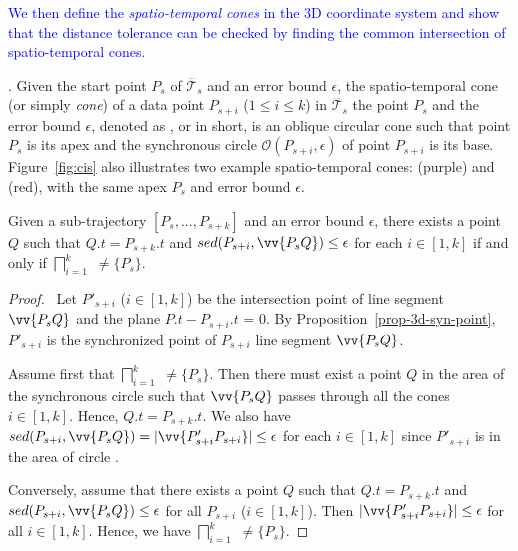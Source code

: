 \textcolor{blue}{We then define the \textit{spatio-temporal cones} in the 3D coordinate system and show that the \sed distance tolerance can be checked by finding the common intersection of spatio-temporal cones.}

. Given the start point $P_s$ of $\dddot{\mathcal{T}_s}$ and an error bound $\epsilon$, the spatio-temporal cone (or simply \textit{cone}) of a data point $P_{s+i}$ ($1\le i\le k$) in $\dddot{\mathcal{T}_s}$ \wrt the point $P_s$ and the error bound $\epsilon$, denoted as , or  in short, is an oblique circular cone such that point $P_s$ is its apex and the synchronous circle $\mathcal{O}(P_{s+i}, \epsilon)$ of point $P_{s+i}$ is its base.
%
Figure~\ref{fig:cis} also illustrates two example spatio-temporal cones:  {(purple)} and  (red), with the same apex $P_s$ and error bound $\epsilon$.






\begin{prop}
\label{prop-3d-ci}
Given a sub-trajectory $[P_s,...,P_{s+k}]$ and an error bound $\epsilon$, there exists a point $Q$ such that $Q.t = P_{s+k}.t$ and $sed(P_{s+i}, \vv{P_sQ})\le \epsilon$ for each $i \in [1,k]$ if and only if $\bigsqcap_{i=1}^{k}$ $\ne \{P_s\}$.
\end{prop}

\begin{proof}\
Let $P'_{s+i}$ ($i\in[1, k]$) be the intersection point of line segment $\vv{P_sQ}$ and the plane $P.t - P_{s+i}.t$ = $0$.
By Proposition~\ref{prop-3d-syn-point}, $P'_{s+i}$ is the synchronized point of $P_{s+i}$ \wrt line segment $\vv{P_sQ}$.

Assume first that $\bigsqcap_{i=1}^{k}$ $\ne \{P_s\}$. Then there must exist a point $Q $ in the area of the  synchronous circle  such that $\vv{P_sQ}$ passes through all the cones  $i\in[1, k]$. Hence,  $Q.t = P_{s+k}.t$.
We also have $sed(P_{s+i}, \vv{P_sQ}) = |\vv{P'_{s+i}P_{s+i}}| \le \epsilon$ for each $i \in [1, k]$  since $P'_{s+i}$  is in the area of circle  \circle{(P_{s+i}, \epsilon)}.

Conversely, assume that there exists a point $Q$ such that $Q.t = P_{s+k}.t$ and $sed(P_{s+i}, \vv{P_sQ})\le\epsilon$ for all $P_{s+i}$ ($i \in [1,k]$). Then $|\vv{P'_{s+i}P_{s+i}}| \le \epsilon$ for all $i \in [1, k]$. Hence, we have  $\bigsqcap_{i=1}^{k}$ $\ne \{P_s\}$. \eop
\end{proof}

